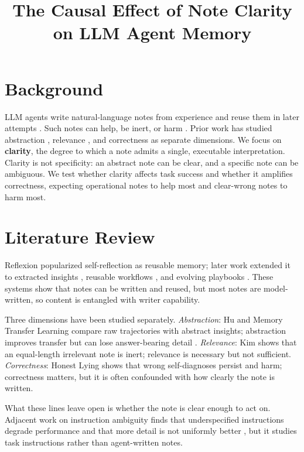 \title{The Causal Effect of Note Clarity on LLM Agent Memory}


\maketitle

\section{Background}

LLM agents write natural-language notes from experience and reuse them in later attempts \cite{reflexion}. Such notes can help, be inert, or harm \cite{kim2026,honestlying}. Prior work has studied abstraction \cite{hu2026,mtl}, relevance \cite{kim2026}, and correctness \cite{honestlying} as separate dimensions. We focus on \textbf{clarity}, the degree to which a note admits a single, executable interpretation. Clarity is not specificity: an abstract note can be clear, and a specific note can be ambiguous. We test whether clarity affects task success and whether it amplifies correctness, expecting operational notes to help most and clear-wrong notes to harm most.

\section{Literature Review}

Reflexion popularized self-reflection as reusable memory; later work extended it to extracted insights \cite{expel}, reusable workflows \cite{awm}, and evolving playbooks \cite{ace}. These systems show that notes can be written and reused, but most notes are model-written, so content is entangled with writer capability.

Three dimensions have been studied separately. \emph{Abstraction}: Hu \cite{hu2026} and Memory Transfer Learning \cite{mtl} compare raw trajectories with abstract insights; abstraction improves transfer but can lose answer-bearing detail \cite{memoryuseful}. \emph{Relevance}: Kim \cite{kim2026} shows that an equal-length irrelevant note is inert; relevance is necessary but not sufficient. \emph{Correctness}: Honest Lying \cite{honestlying} shows that wrong self-diagnoses persist and harm; correctness matters, but it is often confounded with how clearly the note is written.

What these lines leave open is whether the note is clear enough to act on. Adjacent work on instruction ambiguity finds that underspecified instructions degrade performance and that more detail is not uniformly better \cite{ambigswe,morethanascore}, but it studies task instructions rather than agent-written notes.

